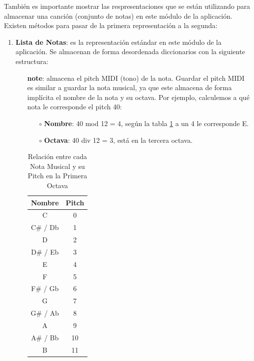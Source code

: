     También es importante mostrar las respresentaciones que se están utilizando para almacenar una canción (conjunto de notas) en este módulo de la aplicación. Existen métodos para pasar de la primera representación a la segunda:

    \begin{enumerate}
        \item \textbf{Lista de Notas}: es la representación estándar en este módulo de la aplicación. Se almacenan de forma desordenada diccionarios con la siguiente estructura:
        \begin{enumerate}
            \item[\textbullet] \textbf{note}: almacena el pitch MIDI (tono) de la nota. Guardar el pitch MIDI es similar a guardar la nota musical, ya que este almacena de forma implícita el nombre de la nota y su octava. Por ejemplo, calculemos a qué nota le corresponde el pitch 40:
            \begin{enumerate}
                    \item[\(\circ\)] \textbf{Nombre}: 40 mod 12 = 4, según la tabla \ref{tab:nota_pitch} a un 4 le corresponde E.
                    \item[\(\circ\)] \textbf{Octava}: 40 div 12 = 3, está en la tercera octava.
            \end{enumerate}
                       
\begin{table}[htbp]
    \centering
    \begin{tabular}{c|c}
        \textbf{Nombre} & \textbf{Pitch} \\
        \hline
        C & 0 \\
        C\# / Db & 1 \\
        D & 2 \\
        D\# / Eb & 3 \\
        E & 4 \\
        F & 5 \\
        F\# / Gb & 6 \\
        G & 7 \\
        G\# / Ab & 8 \\
        A & 9 \\
        A\# / Bb & 10 \\
        B & 11 \\
    \end{tabular}
    \caption{Relación entre cada Nota Musical y su Pitch en la Primera Octava}
\label{tab:nota_pitch}
\end{table}


\end{enumerate}
\end{enumerate}
